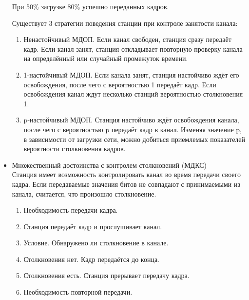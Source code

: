 \documentclass[12pt, russian, oneside, article]{ncc}
\begin{document}
\begin{itemize}
При 50\% загрузке 80\% успешно переданных кадров.

Существует 3 стратегии поведения станции при контроле занятости канала:
\begin{enumerate}
\item Ненастойчивый МДОП. Если канал свободен, станция сразу передаёт кадр. Если канал занят, станция откладывает повторную проверку канала на определённый или случайный промежуток времени.
\item 1-настойчивый МДОП. Если канала занят, станция настойчиво ждёт его освобождения, после чего с вероятностью 1 передаёт кадр. Если освобождения канал ждут несколько станций вероятностью столкновения 1.
\item p-настойчивый МДОП. Станция настойчиво ждёт освобождения канала, после чего с вероятностью p передаёт кадр в канал. Изменяя значение p, в зависимости от загрузки сети, можно добиться приемлемых показателей вероятности столкновения кадров.
\end{enumerate}


\item Множественный достоинства с контролем столкновений (МДКС)\\
\label{sec-5_1_1_4}%
Станция имеет возможность контролировать канал во время передачи своего кадра. Если передаваемые значения битов не совпадают с принимаемыми из канала, считается, что произошло столкновение.

\begin{enumerate}
\item Необходимость передачи кадра.
\item Станция передаёт кадр и прослушивает канал.
\item Условие. Обнаружено ли столкновение в канале.
\item Столкновения нет. Кадр передаётся до конца.
\item Столкновения есть. Станция прерывает передачу кадра.
\item Необходимость повторной передачи.
\end{enumerate}

\end{itemize} %
\end{document}
